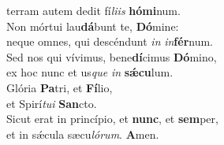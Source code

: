\oddverse terram autem dedit fí\textit{li}\textit{is} \textbf{hó}\textbf{mi}num.\\
\evenverse Non mórtui lau\textbf{dá}bunt te, \textbf{Dó}mine:~\*\\
\evenverse neque omnes, qui descéndunt \textit{in} \textit{in}\textbf{fér}num.\\
\oddverse Sed nos qui vívimus, bene\textbf{dí}cimus \textbf{Dó}mino,~\*\\
\oddverse ex hoc nunc et us\textit{que} \textit{in} \textbf{sǽ}\textbf{cu}lum.\\
\evenverse Glória \textbf{Pa}tri, et \textbf{Fí}lio,~\*\\
\evenverse et Spirí\textit{tu}\textit{i} \textbf{San}cto.\\
\oddverse Sicut erat in princípio, et \textbf{nunc}, et \textbf{sem}per,~\*\\
\oddverse et in sǽcula sæcu\textit{ló}\textit{rum}. \textbf{A}men.\\
